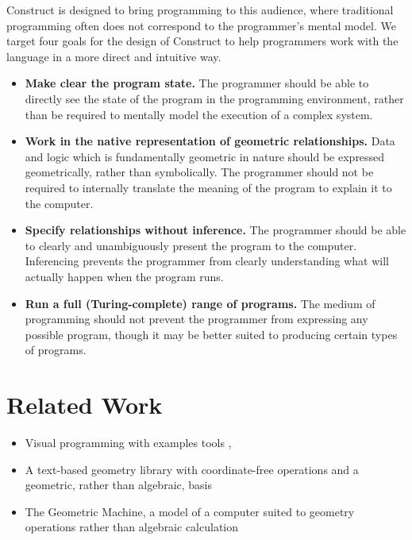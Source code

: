 \documentclass[twoside,11pt]{report}
\begin{document}
Construct is designed to bring programming to this audience, where traditional programming often does not correspond to the programmer's mental model.
We target four goals for the design of Construct to help programmers work with the language in a more direct and intuitive way.

\begin{itemize}
  \item {\bf Make clear the program state.} 
        The programmer should be able to directly see the state of the program in the programming environment, rather than be required to mentally model the execution of a complex system.
  \item {\bf Work in the native representation of geometric relationships.} 
        Data and logic which is fundamentally geometric in nature should be expressed geometrically, rather than symbolically. 
        The programmer should not be required to internally translate the meaning of the program to explain it to the computer.
  \item {\bf Specify relationships without inference.} 
        The programmer should be able to clearly and unambiguously present the program to the computer. 
        Inferencing prevents the programmer from clearly understanding what will actually happen when the program runs.
  \item {\bf Run a full (Turing-complete) range of programs.} 
        The medium of programming should not prevent the programmer from expressing any possible program, though it may be better suited to producing certain types of programs.
\end{itemize}

\section{Related Work}
\label{sec:related}

\begin{itemize}
  \item Visual programming with examples tools \cite{victor2013unthinkable}, \cite{victor2013deadfish}
  \item A text-based geometry library with coordinate-free operations and a geometric, rather than algebraic, basis \cite{derose1989coordinatefree}
  \item The Geometric Machine, a model of a computer suited to geometry operations rather than algebraic calculation \cite{reiser2003programming}
\end{itemize}
\end{document}
